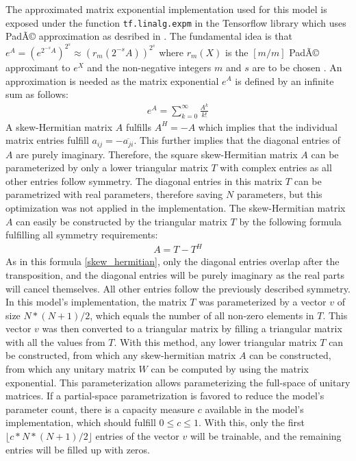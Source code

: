 \documentclass[draft,final]{vutinfth} %
\begin{document}
The approximated matrix exponential implementation used for this model is exposed under the function \texttt{tf.linalg.expm} in the Tensorflow library \cite{Tensorflow} which uses PadÃ© approximation as desribed in \cite{expm}.
The fundamental idea is that $e^A = (e^{2^{-s}A})^{2^s} \approx (r_m(2^{-s}A))^{2^s}$ where $r_m(X)$ is the $[m/m]$ PadÃ© approximant to $e^X$ and the non-negative integers $m$ and $s$ are to be chosen \cite[p. 1]{expm}.
An approximation is needed as the matrix exponential $e^A$ is defined by an infinite sum as follows:
\begin{align}
\label{expm_definition}
e^A = \sum_{k=0}^{\infty} \frac{A^k}{k!}
\end{align}
A skew-Hermitian matrix $A$ fulfills $A^H = -A$ which implies that the individual matrix entries fulfill $a_{ij} = -\overline{a_{ji}}$.
This further implies that the diagonal entries of $A$ are purely imaginary.
Therefore, the square skew-Hermitian matrix $A$ can be parameterized by only a lower triangular matrix $T$ with complex entries as all other entries follow symmetry.
The diagonal entries in this matrix $T$ can be parametrized with real parameters, therefore saving $N$ parameters, but this optimization was not applied in the implementation.
The skew-Hermitian matrix $A$ can easily be constructed by the triangular matrix $T$ by the following formula fulfilling all symmetry requirements:
\begin{align}
\label{skew_hermitian}
A = T - T^H
\end{align}
As in this formula \ref{skew_hermitian}, only the diagonal entries overlap after the transposition, and the diagonal entries will be purely imaginary as the real parts will cancel themselves.
All other entries follow the previously described symmetry.
In this model's implementation, the matrix $T$ was parameterized by a vector $v$ of size $N*(N+1)/2$, which equals the number of all non-zero elements in $T$.
This vector $v$ was then converted to a triangular matrix by filling a triangular matrix with all the values from $T$.
With this method, any lower triangular matrix $T$ can be constructed, from which any skew-hermitian matrix $A$ can be constructed, from which any unitary matrix $W$ can be computed by using the matrix exponential.
This parameterization allows parameterizing the full-space of unitary matrices.
If a partial-space parametrization is favored to reduce the model's parameter count, there is a capacity measure $c$ available in the model's implementation, which should fulfill $0 \leq c \leq 1$.
With this, only the first $\lfloor c*N*(N+1)/2 \rfloor$ entries of the vector $v$ will be trainable, and the remaining entries will be filled up with zeros.
\end{document}
